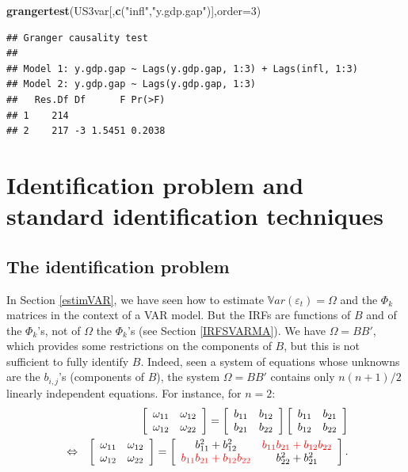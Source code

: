 \documentclass[
  12pt,
]{book}
\newenvironment{Shaded}{\begin{snugshade}}{\end{snugshade}}
\newcommand{\AttributeTok}[1]{\textcolor[rgb]{0.13,0.29,0.53}{#1}}
\newcommand{\DecValTok}[1]{\textcolor[rgb]{0.00,0.00,0.81}{#1}}
\newcommand{\FunctionTok}[1]{\textcolor[rgb]{0.13,0.29,0.53}{\textbf{#1}}}
\newcommand{\NormalTok}[1]{#1}
\newcommand{\StringTok}[1]{\textcolor[rgb]{0.31,0.60,0.02}{#1}}
\theoremstyle{definition}
\theoremstyle{definition}
\theoremstyle{definition}
\theoremstyle{definition}
\theoremstyle{remark}
\begin{document}
\begin{Shaded}
\begin{Highlighting}[]
\FunctionTok{grangertest}\NormalTok{(US3var[,}\FunctionTok{c}\NormalTok{(}\StringTok{"infl"}\NormalTok{,}\StringTok{"y.gdp.gap"}\NormalTok{)],}\AttributeTok{order=}\DecValTok{3}\NormalTok{)}
\end{Highlighting}
\end{Shaded}

\begin{verbatim}
## Granger causality test
## 
## Model 1: y.gdp.gap ~ Lags(y.gdp.gap, 1:3) + Lags(infl, 1:3)
## Model 2: y.gdp.gap ~ Lags(y.gdp.gap, 1:3)
##   Res.Df Df      F Pr(>F)
## 1    214                 
## 2    217 -3 1.5451 0.2038
\end{verbatim}

\chapter{Identification problem and standard identification techniques}\label{identifStruct}

\section{The identification problem}\label{IdentifPbm}

In Section \ref{estimVAR}, we have seen how to estimate \(\mathbb{V}ar(\varepsilon_t) =\Omega\) and the \(\Phi_k\) matrices in the context of a VAR model. But the IRFs are functions of \(B\) and of the \(\Phi_k\)'s, not of \(\Omega\) the \(\Phi_k\)'s (see Section \ref{IRFSVARMA}). We have \(\Omega = BB'\), which provides some restrictions on the components of \(B\), but this is not sufficient to fully identify \(B\). Indeed, seen a system of equations whose unknowns are the \(b_{i,j}\)'s (components of \(B\)), the system \(\Omega = BB'\) contains only \(n(n+1)/2\) linearly independent equations. For instance, for \(n=2\):
\begin{eqnarray*}
&&\left[
\begin{array}{cc}
\omega_{11} & \omega_{12} \\
\omega_{12} & \omega_{22}
\end{array}
\right] = \left[
\begin{array}{cc}
b_{11} & b_{12} \\
b_{21} & b_{22}
\end{array}
\right]\left[
\begin{array}{cc}
b_{11} & b_{21} \\
b_{12} & b_{22}
\end{array}
\right]\\
&\Leftrightarrow&\left[
\begin{array}{cc}
\omega_{11} & \omega_{12} \\
\omega_{12} & \omega_{22}
\end{array}
\right] = \left[
\begin{array}{cc}
b_{11}^2+b_{12}^2 & \color{red}{b_{11}b_{21}+b_{12}b_{22}} \\
\color{red}{b_{11}b_{21}+b_{12}b_{22}} & b_{22}^2 + b_{21}^2
\end{array}
\right].
\end{eqnarray*}
\end{document}
